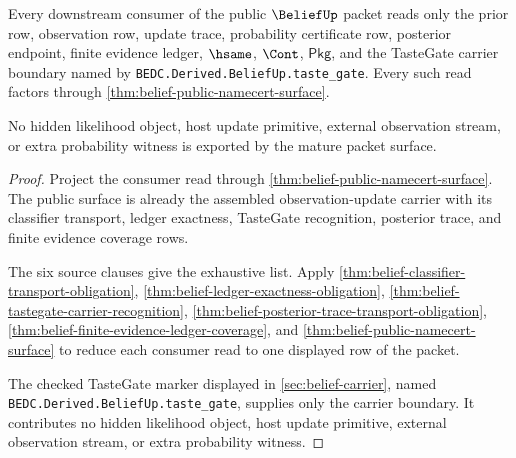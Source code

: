 \begin{theorem}
\label{thm:belief-mature-consumer-exhaustion}
Every downstream consumer of the public $\BeliefUp$ packet reads only the prior
row, observation row, update trace, probability certificate row, posterior
endpoint, finite evidence ledger, $\hsame$, $\Cont$, $\mathsf{Pkg}$, and the
TasteGate carrier boundary named by
\texttt{BEDC.Derived.BeliefUp.taste\_gate}. Every such read factors through
\autoref{thm:belief-public-namecert-surface}.

No hidden likelihood object, host update primitive, external observation
stream, or extra probability witness is exported by the mature packet surface.
\end{theorem}
\begin{proof}
Project the consumer read through
\autoref{thm:belief-public-namecert-surface}. The public surface is already the
assembled observation-update carrier with its classifier transport, ledger
exactness, TasteGate recognition, posterior trace, and finite evidence
coverage rows.

The six source clauses give the exhaustive list. Apply
\autoref{thm:belief-classifier-transport-obligation},
\autoref{thm:belief-ledger-exactness-obligation},
\autoref{thm:belief-tastegate-carrier-recognition},
\autoref{thm:belief-posterior-trace-transport-obligation},
\autoref{thm:belief-finite-evidence-ledger-coverage}, and
\autoref{thm:belief-public-namecert-surface} to reduce each consumer read to
one displayed row of the packet.

The checked TasteGate marker displayed in \autoref{sec:belief-carrier}, named
\texttt{BEDC.Derived.BeliefUp.taste\_gate}, supplies only the carrier boundary.
It contributes no hidden likelihood object, host update primitive, external
observation stream, or extra probability witness.
\end{proof}


